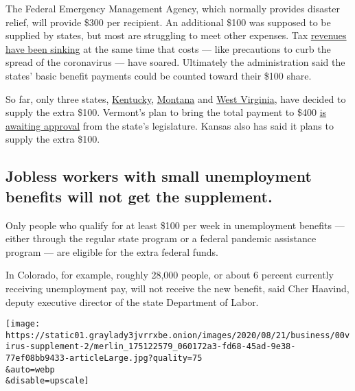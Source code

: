 The Federal Emergency Management Agency, which normally provides
disaster relief, will provide \$300 per recipient. An additional \$100
was supposed to be supplied by states, but most are struggling to meet
other expenses. Tax
\href{https://www.nytimes3xbfgragh.onion/2020/08/14/business/economy/state-local-budget-pain.html}{revenues
have been sinking} at the same time that costs --- like precautions to
curb the spread of the coronavirus --- have soared. Ultimately the
administration said the states' basic benefit payments could be counted
toward their \$100 share.

So far, only three states,
\href{https://www.courier-journal.com/story/news/local/2020/08/21/kentucky-unemployment-benefits-feds-approve-400-weekly-boost/3407444001/}{Kentucky},
\href{https://apnews.com/c74b1d3f46341434e61f19b4c824aaf2}{Montana} and
\href{https://wvmetronews.com/2020/08/28/w-va-approved-for-federal-enhanced-unemployment-benefit-but-questions-arise-over-how-far-that-goes/}{West
Virginia}, have decided to supply the extra \$100. Vermont's plan to
bring the total payment to \$400
\href{https://labor.vermont.gov/press-release/press-release-vermont-secures-federal-funding-increased-unemployment-benefits-through}{is
awaiting approval} from the state's legislature. Kansas also has said it
plans to supply the extra \$100.

\hypertarget{jobless-workers-with-small-unemployment-benefits-will-not-get-the-supplement}{%
\subsection{Jobless workers with small unemployment benefits will not
get the
supplement.}\label{jobless-workers-with-small-unemployment-benefits-will-not-get-the-supplement}}

Only people who qualify for at least \$100 per week in unemployment
benefits --- either through the regular state program or a federal
pandemic assistance program --- are eligible for the extra federal
funds.

In Colorado, for example, roughly 28,000 people, or about 6 percent
currently receiving unemployment pay, will not receive the new benefit,
said Cher Haavind, deputy executive director of the state Department of
Labor.

\texttt{[image: https://static01.graylady3jvrrxbe.onion/images/2020/08/21/business/00virus-supplement-2/merlin\_175122579\_060172a3-fd68-45ad-9e38-77ef08bb9433-articleLarge.jpg?quality=75\\\&auto=webp\\\&disable=upscale]}


